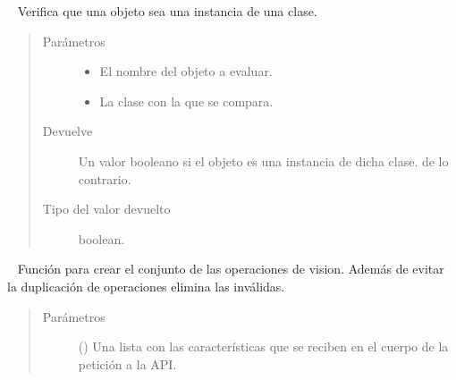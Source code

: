 \begin{fulllineitems}
\begin{fulllineitems}
\begin{quote}
\begin{description}
\end{description}\end{quote}

\end{fulllineitems}

\label{\detokenize{chapter_two/desc_cloudnao:module-app.utils.auxiliar_functions}}\label{\detokenize{chapter_two/desc_cloudnao:module-auxiliar_functions}}

\begin{fulllineitems}
\label{\detokenize{chapter_two/desc_cloudnao:app.utils.auxiliar_functions.check_data_type}}~
Verifica que una objeto sea una instancia de una clase.
\begin{quote}\begin{description}
\item[{Parámetros}] \leavevmode\begin{itemize}
\item {} 
 \textendash{} El nombre del objeto a evaluar.

\item {} 
 \textendash{} La clase con la que se compara.

\end{itemize}

\item[{Devuelve}] \leavevmode
Un valor booleano  si el objeto es una instancia de dicha clase.  de lo contrario.

\item[{Tipo del valor devuelto}] \leavevmode
boolean.

\end{description}\end{quote}

\end{fulllineitems}


\begin{fulllineitems}
\label{\detokenize{chapter_two/desc_cloudnao:app.utils.auxiliar_functions.create_set_of_features}}~
Función para crear el conjunto de las operaciones de vision. Además de evitar
la duplicación de operaciones elimina las inválidas.
\begin{quote}\begin{description}
\item[{Parámetros}] \leavevmode
{} () \textendash{} Una lista con las características que se reciben en el cuerpo de la petición a la API.


\end{description}
\end{quote}
\end{fulllineitems}
\end{fulllineitems}
